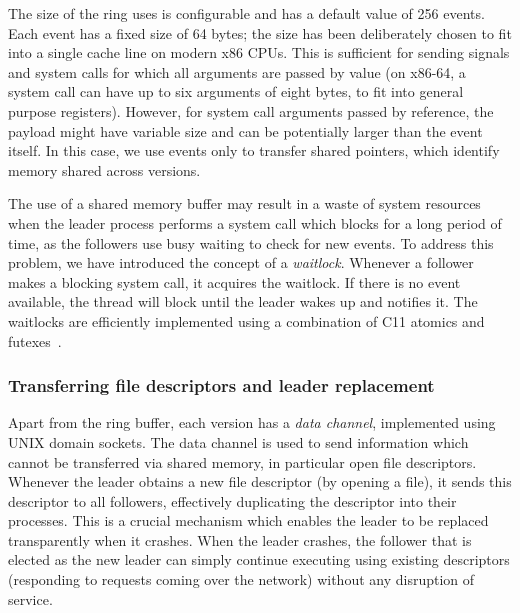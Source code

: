 The size of the ring \varan uses is configurable and has a default
value of 256 events.  Each event has a fixed size of 64 bytes; the
size has been deliberately chosen to fit into a single cache line on
modern x86 CPUs.  This is sufficient for sending signals and system
calls for which all arguments are passed by value (on x86-64, a system
call can have up to six arguments of eight bytes, to fit into general
purpose registers).  However, for system call arguments passed by
reference, the payload might have variable size and can be potentially
larger than the event itself.  In this case, we use events only to
transfer shared pointers, which identify memory shared across
versions.

The use of a shared memory buffer may result in a waste of system
resources when the leader process performs a system call which blocks
for a long period of time, as the followers use busy waiting to check
for new events. To address this problem, we have introduced the
concept of a \emph{waitlock}. Whenever a follower makes a blocking
system call, it acquires the waitlock. If there is no event available,
the thread will block until the leader wakes up and notifies it. The
waitlocks are efficiently implemented using a combination of C11
atomics and futexes~\cite{futex}.

\subsubsection{Transferring file descriptors and leader replacement}
\label{sec:leader-repl}

Apart from the ring buffer, each version has a \textit{data channel},
implemented using UNIX domain sockets.
The data channel is used to send information which cannot be
transferred via shared memory, in particular open file descriptors.
Whenever the leader obtains a new file descriptor (\eg by opening a
file), it sends this descriptor to all followers, effectively
duplicating the descriptor into their processes. This is a crucial
mechanism which enables the leader to be replaced transparently when
it crashes. When the leader crashes, the follower that is elected as
the new leader can simply continue executing using existing
descriptors (\eg responding to requests coming over the network)
without any disruption of service.

